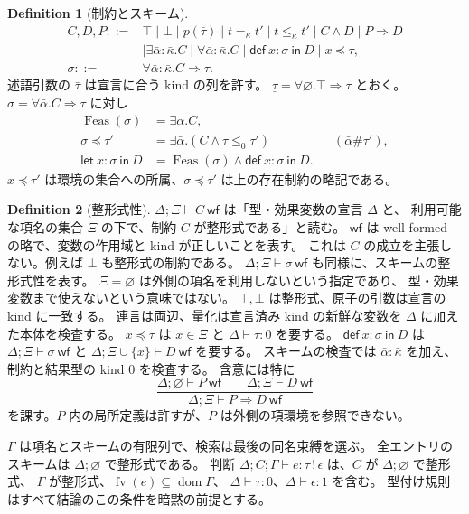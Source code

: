 \documentclass[a4paper,11pt]{article}
\theoremstyle{definition}
\newtheorem{definition}{Definition}[section]
\newcommand{\FV}{\operatorname{fv}}
\newcommand{\dom}{\operatorname{dom}}
\newcommand{\emp}{\varnothing}
\newcommand{\jj}[6]{#1;#2;#3\vdash #4:#5\,!\,#6}
\newcommand{\inst}[2]{#1\preccurlyeq #2}
\newcommand{\Def}[3]{\mathsf{def}\ #1:#2\ \mathsf{in}\ #3}
\newcommand{\Let}[3]{\mathsf{let}\ #1:#2\ \mathsf{in}\ #3}
\newcommand{\mono}[1]{\underline{#1}}
\newcommand{\Feas}{\operatorname{Feas}}
\begin{document}
\begin{definition}[制約とスキーム]
\begin{align*}
 C,D,P::={}&\top\mid\bot\mid p(\bar\tau)\mid t=_\kappa t'
       \mid t\leq_\kappa t'\mid C\land D\mid P\Rightarrow D\\
       &\mid\exists\bar\alpha:\bar\kappa.C
       \mid\forall\bar\alpha:\bar\kappa.C
       \mid\Def{x}{\sigma}{D}\mid\inst{x}{\tau},\\
 \sigma::={}&\forall\bar\alpha:\bar\kappa.C\Rightarrow\tau.
\end{align*}
述語引数の $\bar\tau$ は宣言に合う kind の列を許す。
$\mono\tau=\forall\emp.\top\Rightarrow\tau$ とおく。
$\sigma=\forall\bar\alpha.C\Rightarrow\tau$ に対し
\begin{align*}
 \Feas(\sigma)&=\exists\bar\alpha.C,\\
 \inst{\sigma}{\tau'}&=\exists\bar\alpha.(C\land\tau\leq_0\tau')
       &&(\bar\alpha\#\tau'),\\
 \Let{x}{\sigma}{D}&=\Feas(\sigma)\land\Def{x}{\sigma}{D}.
\end{align*}
$\inst{x}{\tau'}$ は環境の集合への所属、$\inst{\sigma}{\tau'}$ は上の存在制約の略記である。
\end{definition}

\begin{definition}[整形式性]
$\Delta;\Xi\vdash C\ \mathsf{wf}$ は「型・効果変数の宣言 $\Delta$ と、
利用可能な項名の集合 $\Xi$ の下で、制約 $C$ が整形式である」と読む。
$\mathsf{wf}$ は well-formed の略で、変数の作用域と kind が正しいことを表す。
これは $C$ の成立を主張しない。例えば $\bot$ も整形式の制約である。
$\Delta;\Xi\vdash\sigma\ \mathsf{wf}$ も同様に、スキームの整形式性を表す。
$\Xi=\emp$ は外側の項名を利用しないという指定であり、
型・効果変数まで使えないという意味ではない。
$\top,\bot$ は整形式、原子の引数は宣言の kind に一致する。
連言は両辺、量化は宣言済み kind の新鮮な変数を $\Delta$ に加えた本体を検査する。
$\inst{x}{\tau}$ は $x\in\Xi$ と $\Delta\vdash\tau:0$ を要する。
$\Def{x}{\sigma}{D}$ は $\Delta;\Xi\vdash\sigma\ \mathsf{wf}$ と
$\Delta;\Xi\cup\{x\}\vdash D\ \mathsf{wf}$ を要する。
スキームの検査では $\bar\alpha:\bar\kappa$ を加え、制約と結果型の kind $0$ を検査する。
含意には特に
\[
 \frac{\Delta;\emp\vdash P\ \mathsf{wf}\qquad
       \Delta;\Xi\vdash D\ \mathsf{wf}}
      {\Delta;\Xi\vdash P\Rightarrow D\ \mathsf{wf}}
\]
を課す。$P$ 内の局所定義は許すが、$P$ は外側の項環境を参照できない。

$\Gamma$ は項名とスキームの有限列で、検索は最後の同名束縛を選ぶ。
全エントリのスキームは $\Delta;\emp$ で整形式である。
判断 $\jj\Delta C\Gamma e\tau\epsilon$ は、$C$ が $\Delta;\emp$ で整形式、
$\Gamma$ が整形式、$\FV(e)\subseteq\dom\Gamma$、
$\Delta\vdash\tau:0$、$\Delta\vdash\epsilon:1$ を含む。
型付け規則はすべて結論のこの条件を暗黙の前提とする。
\end{definition}
\end{document}

